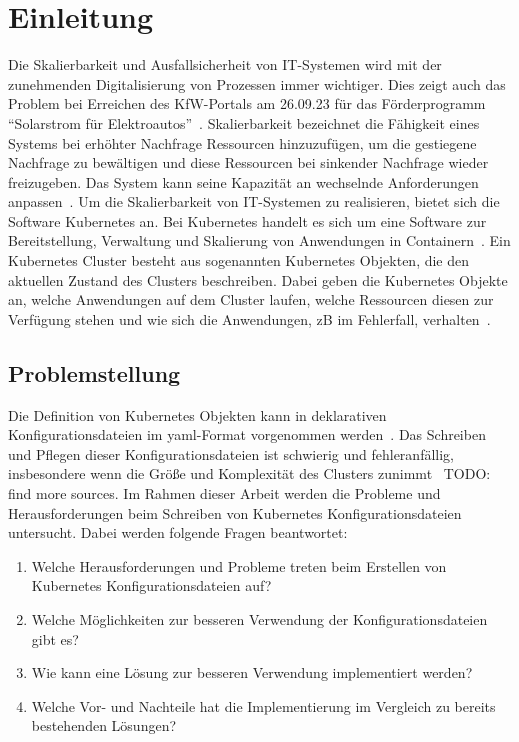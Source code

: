 \chapter{Einleitung}\label{ch:introduction}

Die Skalierbarkeit und Ausfallsicherheit von IT-Systemen wird mit der zunehmenden Digitalisierung von Prozessen immer wichtiger.
Dies zeigt auch das Problem bei Erreichen des KfW-Portals am 26.09.23 für das Förderprogramm ``Solarstrom für Elektroautos''~\cite{kfw-not-reachable}.
Skalierbarkeit bezeichnet die Fähigkeit eines Systems bei erhöhter Nachfrage Ressourcen hinzuzufügen, um die gestiegene Nachfrage zu bewältigen und
diese Ressourcen bei sinkender Nachfrage wieder freizugeben. Das System kann seine Kapazität an wechselnde Anforderungen anpassen~\cite{it-system-scaling}.
Um die Skalierbarkeit von IT-Systemen zu realisieren, bietet sich die Software Kubernetes an.
Bei Kubernetes handelt es sich um eine Software zur Bereitstellung, Verwaltung und Skalierung von Anwendungen in Containern~\cite{kubernetes-overview}.
Ein Kubernetes Cluster besteht aus sogenannten Kubernetes Objekten, die den aktuellen Zustand des Clusters beschreiben. Dabei geben die Kubernetes Objekte an,
welche Anwendungen auf dem Cluster laufen, welche Ressourcen diesen zur Verfügung stehen und wie sich die Anwendungen, \acs{zB} im Fehlerfall, verhalten~\cite{kubernetes-objects}.

\section{Problemstellung}\label{sec:problem}

Die Definition von Kubernetes Objekten kann in deklarativen Konfigurationsdateien im \acs{yaml}-Format vorgenommen werden~\cite{kubernetes-config-declarative}.
Das Schreiben und Pflegen dieser Konfigurationsdateien ist schwierig und fehleranfällig, insbesondere wenn die Größe und Komplexität des Clusters zunimmt~\cite{kubernetes-config-problems} TODO: find more sources.
Im Rahmen dieser Arbeit werden die Probleme und Herausforderungen beim Schreiben von  Kubernetes Konfigurationsdateien untersucht.
Dabei werden folgende Fragen beantwortet:
\begin{enumerate}
    \item Welche Herausforderungen und Probleme treten beim Erstellen von Kubernetes Konfigurationsdateien auf?
    \item Welche Möglichkeiten zur besseren Verwendung der Konfigurationsdateien gibt es?
    \item Wie kann eine Lösung zur besseren Verwendung implementiert werden?
    \item Welche Vor- und Nachteile hat die Implementierung im Vergleich zu bereits bestehenden Lösungen?
\end{enumerate}

